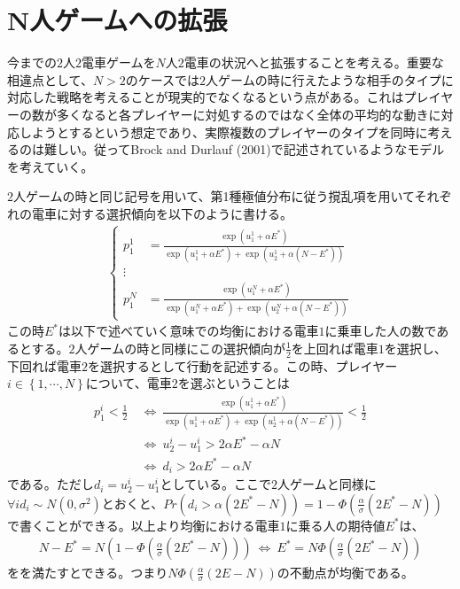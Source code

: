 \documentclass{jsarticle}
\begin{document}
\section{N人ゲームへの拡張}
今までの$2$人$2$電車ゲームを$N$人$2$電車の状況へと拡張することを考える。重要な相違点として、$N > 2$のケースでは$2$人ゲームの時に行えたような相手のタイプに対応した戦略を考えることが現実的でなくなるという点がある。これはプレイヤーの数が多くなると各プレイヤーに対処するのではなく全体の平均的な動きに対応しようとするという想定であり、実際複数のプレイヤーのタイプを同時に考えるのは難しい。従ってBrock and Durlauf (2001)で記述されているようなモデルを考えていく。

$2$人ゲームの時と同じ記号を用いて、第1種極値分布に従う撹乱項を用いてそれぞれの電車に対する選択傾向を以下のように書ける。
\begin{align*}
	\begin{cases}
	p_1^1 &= \frac{\exp(u_1^1 + \alpha E^*)}{\exp(u_1^1 + \alpha E^*) + \exp(u_2^1 + \alpha(N - E^*))}\\[8pt]
	\vdots\\[8pt]
	p_1^N &= \frac{\exp(u_1^N + \alpha E^*)}{\exp(u_1^N + \alpha E^*) + \exp(u_2^N + \alpha(N - E^*))}
	\end{cases}
\end{align*}
この時$E^*$は以下で述べていく意味での均衡における電車$1$に乗車した人の数であるとする。$2$人ゲームの時と同様にこの選択傾向が$\frac{1}{2}$を上回れば電車$1$を選択し、下回れば電車$2$を選択するとして行動を記述する。この時、プレイヤー$i \in \left\{ 1, \cdots, N\right\}$について、電車$2$を選ぶということは
\begin{align*}
	p_1^i < \frac{1}{2}\ &\Leftrightarrow\ \frac{\exp(u_1^1 + \alpha E^*)}{\exp(u_1^1 + \alpha E^*) + \exp(u_2^1 + \alpha(N - E^*))} < \frac{1}{2}\\[8pt]
	&\Leftrightarrow\ u_2^i - u_1^i > 2\alpha E^* - \alpha N\\[8pt]
	&\Leftrightarrow\ d_i > 2\alpha E^* - \alpha N
\end{align*}
である。ただし$d_i = u_2^i - u_1^i$としている。ここで$2$人ゲームと同様に$\forall i d_i \sim N(0,\sigma^2)$とおくと、$Pr(d_i > \alpha(2E^* - N)) = 1 - \Phi \left(\frac{\alpha}{\sigma}(2 E^* - N)\right)$で書くことができる。以上より均衡における電車$1$に乗る人の期待値$ E^*$は、
\begin{align*}
	N - E^* =  N(1 - \Phi \left(\frac{\alpha}{\sigma}(2 E^* - N)\right))\ \Leftrightarrow\  E^* = N\Phi \left(\frac{\alpha}{\sigma}(2 E^* - N)\right)
\end{align*}
をを満たすとできる。つまり$N \Phi \left(\frac{\alpha}{\sigma}(2 E - N)\right)$の不動点が均衡である。
\end{document}
